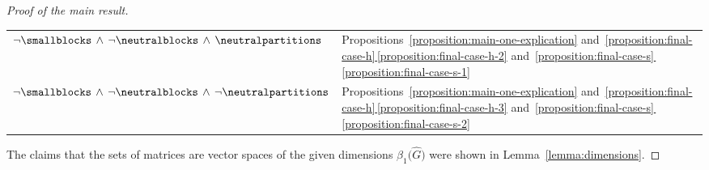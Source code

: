 \documentclass[10pt,a4paper]{amsart}
\numberwithin{equation}{section}
\newcommand{\Sand}{\,\wedge\,}
\begin{document}
\begin{proof}[Proof of the main result]
\begin{table}[h!]
\begin{tabular}{l|l}
    $\neg\smallblocks \Sand\neg\neutralblocks\Sand \neutralpartitions$ & Pro\-po\-si\-tions~\ref{proposition:main-one-explication} and~\hyperref[proposition:final-case-h-2]{\ref*{proposition:final-case-h}\,\ref*{proposition:final-case-h-2}} and~\hyperref[proposition:final-case-s-1]{\ref*{proposition:final-case-s}\,\ref*{proposition:final-case-s-1}}\\
$\neg\smallblocks \Sand\neg\neutralblocks\Sand \neg\neutralpartitions$ & Pro\-po\-si\-tions~\ref{proposition:main-one-explication} and~\hyperref[proposition:final-case-h-3]{\ref*{proposition:final-case-h}\,\ref*{proposition:final-case-h-3}} and~\hyperref[proposition:final-case-s-2]{\ref*{proposition:final-case-s}\,\ref*{proposition:final-case-s-2}}
  \end{tabular}
\end{table}

  The claims that the sets of matrices are vector spaces of the given dimensions $\beta_1\bigl(\widehat{G}\bigr)$ were shown in Lem\-ma~\ref{lemma:dimensions}.
    \end{proof}
\end{document}

